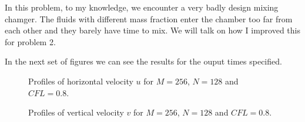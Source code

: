 In this problem, to my knowledge, we encounter a very badly design mixing chamger. The fluids with different mass fraction enter the chamber too far from each other and they barely have time to mix. We will talk on how I improved this for problem 2.

In the next set of figures we can see the results for the ouput times specified.

\begin{figure}[H]
\centering     %
\hspace*{\fill}
\hfill
{}
\hspace*{\fill}

\hspace*{\fill}
\hfill
{}
\hspace*{\fill}

\hspace*{\fill}
\hfill
{}
\hspace*{\fill}
\caption{Profiles of horizontal velocity $u$ for $M=256$, $N=128$ and $CFL=0.8$.}
\end{figure}

\begin{figure}[H]
\centering     %
\hspace*{\fill}
\hfill
{}
\hspace*{\fill}

\hspace*{\fill}
\hfill
{}
\hspace*{\fill}

\hspace*{\fill}
\hfill
{}
\hspace*{\fill}
\caption{Profiles of vertical velocity $v$ for $M=256$, $N=128$ and $CFL=0.8$.}
\end{figure}


